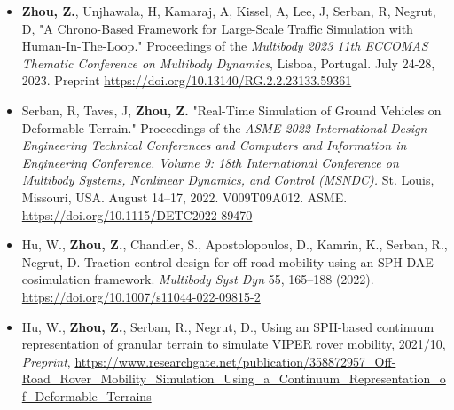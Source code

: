 



\begin{footnotesize}

\begin{itemize}[leftmargin=2ex, nosep, noitemsep]
	
	\item {\textbf{Zhou, Z.}, Unjhawala, H, Kamaraj, A, Kissel, A, Lee, J, Serban, R, Negrut, D,  "A Chrono-Based Framework for Large-Scale Traffic Simulation with Human-In-The-Loop." Proceedings of the \textit {Multibody 2023 11th ECCOMAS Thematic Conference on Multibody Dynamics}, Lisboa, Portugal. July 24-28, 2023. Preprint \url{https://doi.org/10.13140/RG.2.2.23133.59361}}
	
	
	\item {Serban, R, Taves, J, \textbf{Zhou, Z.} "Real-Time Simulation of Ground Vehicles on Deformable Terrain." Proceedings of the \textit {ASME 2022 International Design Engineering Technical Conferences and Computers and Information in Engineering Conference. Volume 9: 18th International Conference on Multibody Systems, Nonlinear Dynamics, and Control (MSNDC).} St. Louis, Missouri, USA. August 14–17, 2022. V009T09A012. ASME. \url{https://doi.org/10.1115/DETC2022-89470}}
	
	
	\item {Hu, W., \textbf{Zhou, Z.}, Chandler, S., Apostolopoulos, D., Kamrin, K., Serban, R., Negrut, D. Traction control design for off-road mobility using an SPH-DAE cosimulation framework. \textit {Multibody Syst Dyn} 55, 165–188 (2022). \url{https://doi.org/10.1007/s11044-022-09815-2}}
	
	
	\item {Hu, W., \textbf{Zhou, Z.}, Serban, R., Negrut, D., Using an SPH-based continuum representation of granular terrain to simulate VIPER rover mobility, 2021/10, \textit{Preprint}, \url{https://www.researchgate.net/publication/358872957_Off-Road_Rover_Mobility_Simulation_Using_a_Continuum_Representation_of_Deformable_Terrains}}
	

\end{itemize}
\end{footnotesize}
